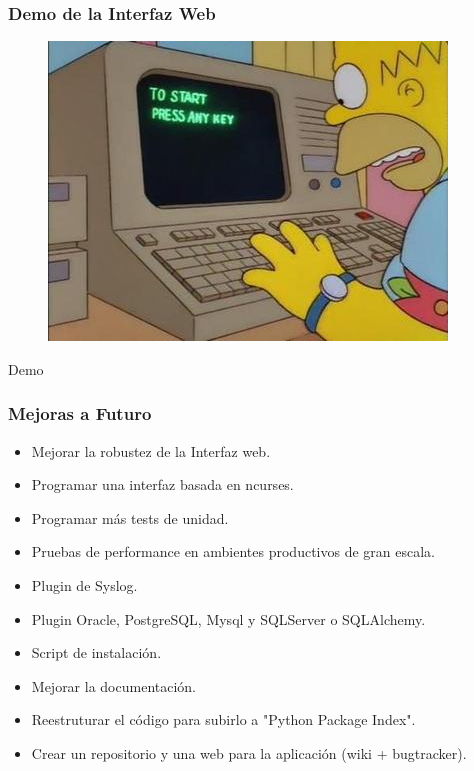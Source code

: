 \documentclass[10pt,a4paper]{beamer}
\begin{document}
\begin{frame}

	\frametitle{Demo de la Interfaz Web}
	\begin{figure}[hbtp]
		\includegraphics[scale=0.4]{img/demo.jpg}
	\end{figure}
	\begin{center}
		\huge{Demo}
	\end{center}
	
\end{frame}

\begin{frame}
	\frametitle{Mejoras a Futuro}
	\begin{itemize}
	
	\item Mejorar la robustez de la Interfaz web.
	\item Programar una interfaz basada en ncurses.
	\item Programar más tests de unidad.
	\item Pruebas de performance en ambientes productivos de gran escala.
	\item Plugin de Syslog.
	\item Plugin Oracle, PostgreSQL, Mysql y SQLServer o SQLAlchemy.
	\item Script de instalación.
	\item Mejorar la documentación.
	\item Reestruturar el código para subirlo a "Python Package Index".
	\item Crear un repositorio y una web para la aplicación (wiki + bugtracker).

	\end{itemize}
	

\end{frame}
\end{document}
